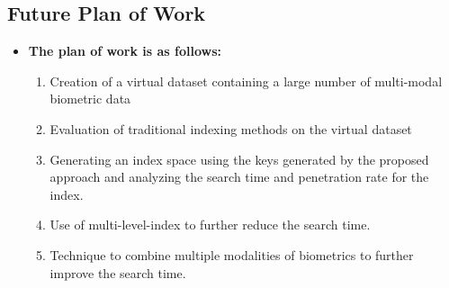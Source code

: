 \subsection{Future Plan of Work}
\begin{frame}[t]{\subsecname}
	\topline
    \begin{itemize}
    	\item \textcolor{navy_theme}{\textbf{The plan of work is as follows:}}
    	\vspace{1em}
                \begin{enumerate}
                \setlength\itemsep{1em}
        
                \item<1,6> Creation of a virtual dataset containing a large number of multi-modal biometric data
                \item<2,6> Evaluation of traditional indexing methods on the virtual dataset
                \item<3,6> Generating an index space using the keys generated by the proposed approach and analyzing the search time and penetration rate for the index.
                \item<4,6> Use of multi-level-index to further reduce the search time.
                \item<5,6> Technique to combine multiple modalities of biometrics to further improve the search time.
        \end{enumerate}
	\end{itemize}
\end{frame}
